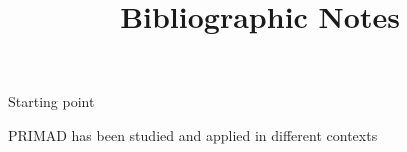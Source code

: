 \documentclass[sigconf,screen,nonacm]{acmart}
\begin{document}
\title{Bibliographic Notes}

 

\maketitle



Starting point \cite{rauber16primad}

PRIMAD has been studied and applied in different contexts \cite{ferro2016increasing,chapp2019applicability}



%

\end{document}
